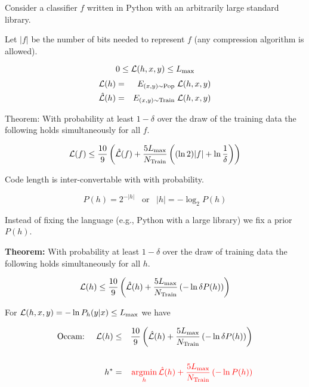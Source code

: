 {

Consider a classifier $f$ written in Python with an arbitrarily large standard library.

\vfill
Let $|f|$ be the number of bits needed to represent $f$ (any compression algorithm is allowed).


\vfill
$$0 \leq {\cal L}(h,x,y) \leq L_{\max}$$
\begin{eqnarray*}
{\cal L}(h)  & = &  E_{(x,y)\sim \mathrm{Pop}}\;{\cal L}(h,x,y) \\
\hat{{\cal L}}(h) & = & E_{(x,y)\sim \mathrm{Train}}\;{\cal L}(h,x,y)
\end{eqnarray*}

\vfill
Theorem: With probability at least $1-\delta$ over the draw of the training data the following holds simultaneously for all $f$.

{\color{red} $${\cal L}(f) \leq \frac{10}{9}\left(\hat{{\cal L}}(f) + \frac{5L_{\max}}{N_\mathrm{Train}}\left((\ln 2)|f| +\ln\frac{1}{\delta}\right)\right)$$}



Code length is inter-convertable with with probability.

$$P(h) = 2^{-|h|}\;\;\;\mbox{or}\;\;\;|h| = - \log_2 P(h)$$

\vfill
Instead of fixing the language (e.g., Python with a large library) we fix a prior $P(h)$.

\vfill
    {\bf Theorem:} With probability
    at least $1-\delta$ over the draw of training data the following holds simultaneously for all $h$.

\vfill
    $${\cal L}(h) \leq \frac{10}{9}\left(\hat{\cal L}(h) + \frac{5 L_\mathrm{max}}{N_\mathrm{Train}}\left(- \ln \delta P(h)\right)\right)$$


For {\color{red} ${\cal L}(h,x,y) = -\ln P_h(y|x) \leq L_{\mathrm{max}}$} we have

\vfill
\begin{eqnarray*}
\mbox{Occam:}\;\;\;\;\;{\cal L}(h) & \leq & \frac{10}{9}\left(\hat{\cal L}(h) + \frac{5 L_\mathrm{max}}{N_\mathrm{Train}}\left(- \ln \delta P(h)\right)\right) \\
\\
h^* & = & {\color{red} \operatorname*{argmin}_h \hat{\cal L}(h) + \frac{5 L_\mathrm{max}}{N_\mathrm{Train}}\left(- \ln P(h)\right)}
\end{eqnarray*}

}
